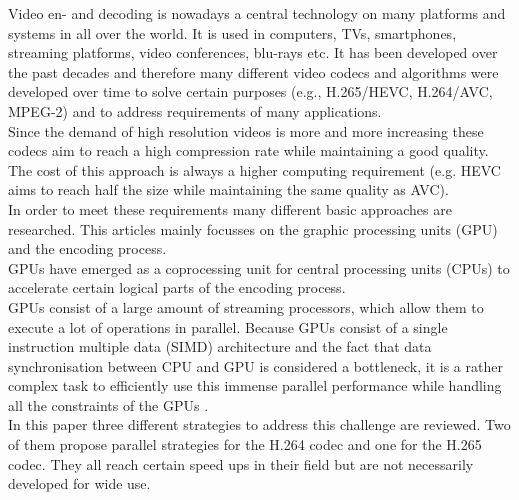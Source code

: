 Video en- and decoding is nowadays a central technology on many platforms and systems in all over the world. It is used in computers, TVs, smartphones, streaming platforms, video conferences, blu-rays etc.
It has been developed over the past decades and therefore many different video codecs and algorithms were developed over time to solve certain purposes (e.g., H.265/HEVC, H.264/AVC, MPEG-2) and to address requirements of many applications.\\
Since the demand of high resolution videos is more and more increasing these codecs aim to reach a high compression rate while maintaining a good quality. The cost of this approach is always a higher computing requirement (e.g. HEVC aims to reach half the size while maintaining the same quality as AVC).\\
In order to meet these requirements many different basic approaches are researched. This articles mainly focusses on the graphic processing units (GPU) and the encoding process.\\
GPUs have emerged as a coprocessing unit for central processing units (CPUs) to accelerate certain logical parts of the encoding process.\\
GPUs consist of a large amount of streaming processors, which allow them to execute a lot of operations in parallel. Because GPUs consist of a single instruction multiple data (SIMD) architecture  and the fact that data synchronisation between CPU and GPU is considered a bottleneck, it is a rather complex task to efficiently use this immense parallel performance while handling all the constraints of the GPUs .\\
In this paper three different strategies to address this challenge are reviewed. Two of them propose parallel strategies for the H.264 codec and one for the H.265 codec. They all reach certain speed ups in their field but are not necessarily developed for wide use.